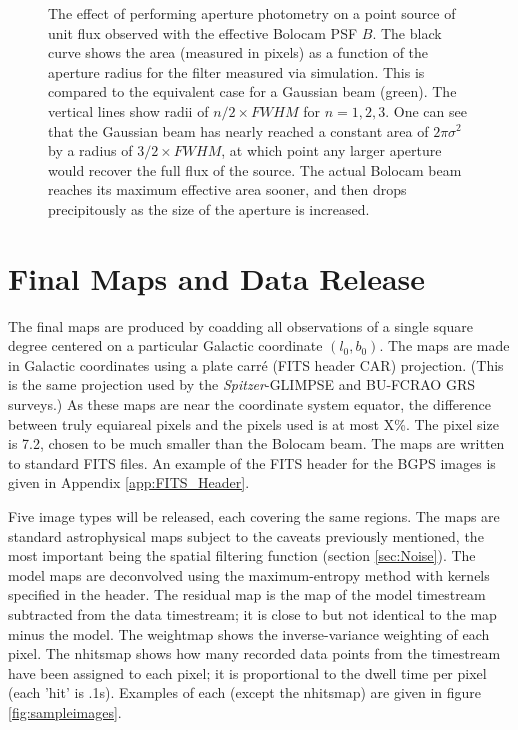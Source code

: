 \documentclass[12pt,preprint]{aastex}
\def\spitzer{{\em Spitzer}}
\def\Figure#1#2#3#4{
\begin{figure}[htb]
\epsscale{#4}
\plotone{#1}
\caption{#2}
\label{#3}
\end{figure}
}
\begin{document}
\Figure{aper_phot_hpf_beam}{The effect of performing aperture
photometry on a point source of unit flux observed with the effective
Bolocam PSF $B$.  The black curve shows the area (measured in pixels)
as a function of the aperture radius for the filter measured via
simulation.  This is compared to the equivalent case for a Gaussian
beam (green).  The vertical lines show radii of $n/2 \times FWHM$ for
$n=1,2,3$.  One can see that the Gaussian beam has nearly reached a
constant area of $2 \pi \sigma^2$ by a radius of $3/2 \times FWHM$, at
which point any larger aperture would recover the full flux of the
source.  The actual Bolocam beam reaches its maximum effective area
sooner, and then drops precipitously as the size of the aperture is
increased.  }{fig:ESF}{1.0}

\clearpage 

\section{Final Maps and Data Release}
\label{sec:FinalMaps}

The final maps are produced by coadding all observations of a single
square degree centered on a particular Galactic coordinate
$(l_0,b_0)$.  The maps are made in Galactic coordinates using a plate
carr\'{e} (FITS header CAR) projection.  (This is the same projection
used by the \spitzer-GLIMPSE and BU-FCRAO GRS surveys.)  As these maps
are near the coordinate system equator, the difference between truly
equiareal pixels and the pixels used is at most X\%.  The pixel size
is 7.2\arcsec, chosen to be much smaller than the Bolocam beam.
The maps are written to standard FITS files.  An example of the FITS
header for the BGPS images is given in Appendix \ref{app:FITS_Header}.

Five image types will be released, each covering the same regions.  The maps
are standard astrophysical maps subject to the caveats previously mentioned,
the most important being the spatial filtering function (section \ref{sec:Noise}).
The model maps are deconvolved using the maximum-entropy method with kernels
specified in the header.  The residual map is the map of the model timestream
subtracted from the data timestream; it is close to but not identical to the
map minus the model.  The weightmap shows the inverse-variance weighting of
each pixel.  The nhitsmap shows how many recorded data points from the
timestream have been assigned to each pixel; it is proportional to the dwell
time per pixel (each 'hit' is .1s).  Examples of each (except the nhitsmap)
are given in figure \ref{fig:sampleimages}.
\end{document}

